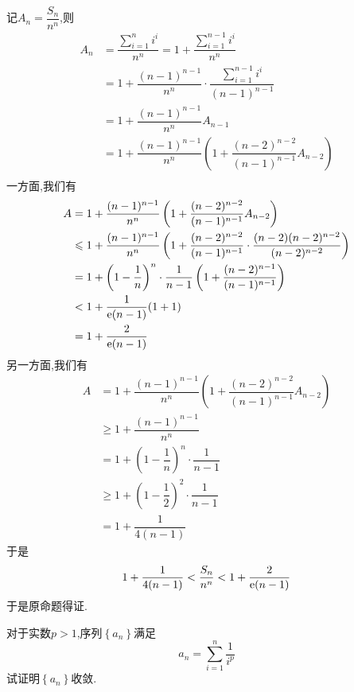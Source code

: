 \documentclass{ctexart}
\begin{document}
\begin{solution}[Proof.]
    记$A_n=\dfrac{S_n}{n^n}$,则
    $$\begin{aligned}
        A_n
        &= \dfrac{\sum_{i=1}^{n}i^i}{n^n}
        = 1+\dfrac{\sum_{i=1}^{n-1}i^i}{n^n} \\
        &= 1+\dfrac{(n-1)^{n-1}}{n^n}\cdot\dfrac{\sum_{i=1}^{n-1}i^i}{(n-1)^{n-1}} \\
        &= 1+\dfrac{(n-1)^{n-1}}{n^n}A_{n-1} \\
        &= 1+\dfrac{(n-1)^{n-1}}{n^n}\left(1+\dfrac{(n-2)^{n-2}}{(n-1)^{n-1}}A_{n-2}\right) \\
    \end{aligned}$$
    一方面,我们有
    $$\begin{aligned}
        A
        &= 1+\dfrac{(n-1)^{n-1}}{n^n}\left(1+\dfrac{(n-2)^{n-2}}{(n-1)^{n-1}}A_{n-2}\right) \\
        &\leqslant 1+\dfrac{(n-1)^{n-1}}{n^n}\left(1+\dfrac{(n-2)^{n-2}}{(n-1)^{n-1}}\cdot\dfrac{(n-2)(n-2)^{n-2}}{(n-2)^{n-2}}\right) \\
        &= 1+\left(1-\dfrac{1}{n}\right)^{n}\cdot\dfrac{1}{n-1}\left(1+\dfrac{(n-2)^{n-1}}{(n-1)^{n-1}}\right) \\
        &< 1+\dfrac{1}{\mathrm{e}(n-1)}(1+1) \\
        &= 1+\dfrac{2}{\mathrm{e}(n-1)}
    \end{aligned}$$
    另一方面,我们有
    $$\begin{aligned}
        A
        &= 1+\dfrac{(n-1)^{n-1}}{n^n}\left(1+\dfrac{(n-2)^{n-2}}{(n-1)^{n-1}}A_{n-2}\right) \\
        &\geqslant 1+\dfrac{(n-1)^{n-1}}{n^n} \\
        &= 1+\left(1-\dfrac{1}{n}\right)^{n}\cdot\dfrac{1}{n-1} \\
        &\geqslant 1+\left(1-\dfrac{1}{2}\right)^{2}\cdot\dfrac{1}{n-1} \\
        &= 1+\dfrac{1}{4(n-1)}
    \end{aligned}$$
    于是$$1+\dfrac{1}{4(n-1)}<\dfrac{S_n}{n^n}<1+\dfrac{2}{\mathrm{e}(n-1)}$$
    于是原命题得证.
\end{solution}
\begin{problem}[Problem 3.]
    对于实数$p>1$,序列$\left\{a_n\right\}$满足$$a_n=\sum_{i=1}^{n}\dfrac{1}{i^p}$$
    试证明$\left\{a_n\right\}$收敛.
\end{problem}
\end{document}
